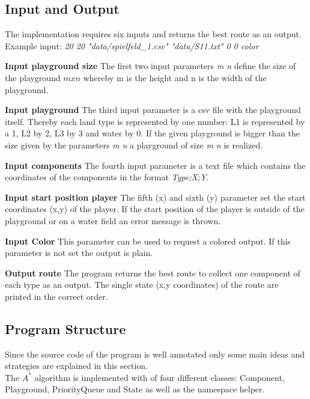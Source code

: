 \documentclass{article}
\begin{document}
\subsection{Input and Output}
The implementation requires six inputs and returns the best route as an output.\\
Example input: \textit{20 20 "data/spielfeld\_1.csv" "data/S11.txt" 0 0 color}\\
\begin{description}
    \item{\textbf{Input playground size}} The first two input parameters \textit{m n} define the size of the playground $m x n$ whereby m is the height and n is the width of the playground. %
    \item{\textbf{Input playground}} The third input parameter is a csv file with the playground itself. Thereby each land type is represented by one number: L1 is represented by a 1, L2 by 2, L3 by 3 and water by 0. If the given playground is bigger than the size given by the parameters \textit{m n} a playground of size \textit{m n} is realized.
    \item{\textbf{Input components}} The fourth input parameter is a text file which contains the coordinates of the components in the format \textit{Type;X;Y}.
    \item{\textbf{Input start position player}} The fifth (x) and sixth (y) parameter set the start coordinates (x,y) of the player.  If the start position of the player is outside of the playground or on a water field an error message is thrown.
    \item{\textbf{Input Color}} This parameter can be used to request a colored output. If this parameter is not set the output is plain.
    \item{\textbf{Output route}} The program returns the best route to collect one component of each type as an output. The single state (x,y coordinates) of the route are printed in the correct order.
\end{description}

\subsection{Program Structure}
Since the source code of the program is well annotated only some main ideas and strategies are explained in this section.\\
The $A^*$ algorithm is implemented with of four different classes: Component, Playground, PriorityQueue and State as well as the namespace helper. 
\end{document}
